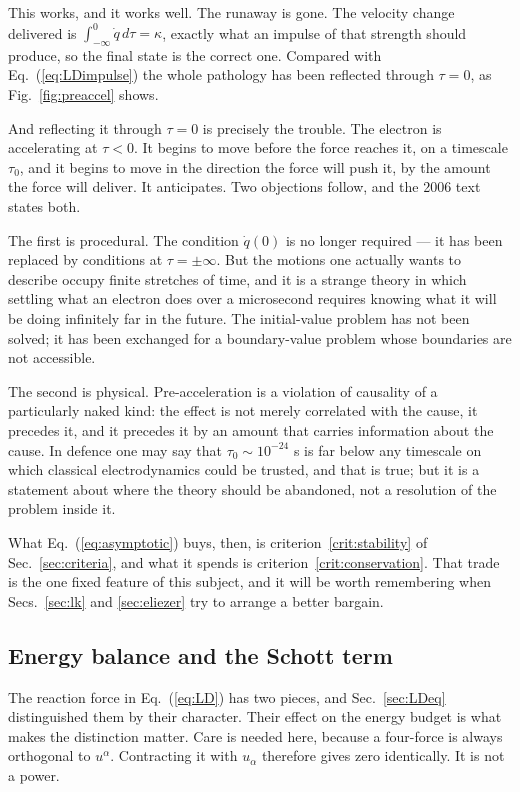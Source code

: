 \documentclass[preprint]{aastex701}
\newcommand{\taunought}{\tau_0}
\begin{document}
This works, and it works well. The runaway is gone. The velocity change
delivered is
$\int_{-\infty}^{0}\dot q\,d\tau = \kappa$, exactly what an impulse of that
strength should produce, so the final state is the correct one. Compared with
Eq.~(\ref{eq:LDimpulse}) the whole pathology has been reflected through
$\tau=0$, as Fig.~\ref{fig:preaccel} shows.

And reflecting it through $\tau=0$ is precisely the trouble. The electron is
accelerating at $\tau<0$. It begins to move before the force reaches it, on a
timescale $\taunought$, and it begins to move in the direction the force will
push it, by the amount the force will deliver. It anticipates. Two objections
follow, and the 2006 text states both.

The first is procedural. The condition $\dot q(0)$ is no longer required ---
it has been replaced by conditions at $\tau = \pm\infty$. But the motions one
actually wants to describe occupy finite stretches of time, and it is a strange
theory in which settling what an electron does over a microsecond requires
knowing what it will be doing infinitely far in the future. The initial-value
problem has not been solved; it has been exchanged for a boundary-value problem
whose boundaries are not accessible.

The second is physical. Pre-acceleration is a violation of causality of a
particularly naked kind: the effect is not merely correlated with the cause, it
precedes it, and it precedes it by an amount that carries information about the
cause. In defence one may say that $\taunought \sim 10^{-24}$ s is far below
any timescale on which classical electrodynamics could be trusted, and that is
true; but it is a statement about where the theory should be abandoned, not a
resolution of the problem inside it.

What Eq.~(\ref{eq:asymptotic}) buys, then, is criterion~\ref{crit:stability} of
Sec.~\ref{sec:criteria}, and what it spends is
criterion~\ref{crit:conservation}. That trade is the one fixed feature of this
subject, and it will be worth remembering when Secs.~\ref{sec:lk} and
\ref{sec:eliezer} try to arrange a better bargain.

\subsection{Energy balance and the Schott term}
\label{sec:schott}

The reaction force in Eq.~(\ref{eq:LD}) has two pieces, and
Sec.~\ref{sec:LDeq} distinguished them by their character. Their effect on the
energy budget is what makes the distinction matter. Care is needed here,
because a four-force is always orthogonal to $u^\alpha$. Contracting it with
$u_\alpha$ therefore gives zero identically. It is not a power.
\end{document}
